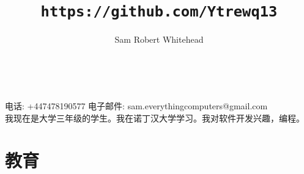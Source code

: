 \documentclass[10pt]{extarticle}
\renewcommand{\maketitle}{
    {
    \centering
        \huge\bfseries\theauthor{}\\
        \Large\thetitle{}\par
    }
}
\begin{document}
    \title{\texttt{https://github.com/Ytrewq13}}
    \author{Sam Robert Whitehead}

    \maketitle

    \pagestyle{empty}

    电话: +447478190577
    \hfill
    电子邮件: sam.everythingcomputers@gmail.com\\
    {}
    \vspace{1mm}
    我现在是大学三年级的学生。我在诺丁汉大学学习。我对软件开发兴趣，编程。
    \section{教育} %
\end{document}
